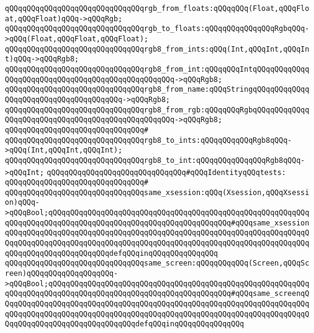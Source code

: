 \verb|qQQqqQQqqQQqqQQqqQQqqQQqqQQqqQQqrgb_from_floats:qQQqqQQq(Float,qQQqFloat,qQQqFloat)qQQq->qQQqRgb;|\newline
\verb|qQQqqQQqqQQqqQQqqQQqqQQqqQQqqQQqrgb_to_floats:qQQqqQQqqQQqqQQqRgbqQQq->qQQq(Float,qQQqFloat,qQQqFloat);|\newline
\newline
\verb|qQQqqQQqqQQqqQQqqQQqqQQqqQQqqQQqrgb8_from_ints:qQQq(Int,qQQqInt,qQQqInt)qQQq->qQQqRgb8;|\newline
\verb|qQQqqQQqqQQqqQQqqQQqqQQqqQQqqQQqrgb8_from_int:qQQqqQQqIntqQQqqQQqqQQqqQQqqQQqqQQqqQQqqQQqqQQqqQQqqQQqqQQqqQQq->qQQqRgb8;|\newline
\verb|qQQqqQQqqQQqqQQqqQQqqQQqqQQqqQQqrgb8_from_name:qQQqStringqQQqqQQqqQQqqQQqqQQqqQQqqQQqqQQqqQQqqQQq->qQQqRgb8;|\newline
\verb|qQQqqQQqqQQqqQQqqQQqqQQqqQQqqQQqrgb8_from_rgb:qQQqqQQqRgbqQQqqQQqqQQqqQQqqQQqqQQqqQQqqQQqqQQqqQQqqQQqqQQqqQQq->qQQqRgb8;|\newline
\verb|qQQqqQQqqQQqqQQqqQQqqQQqqQQqqQQq#|\newline
\verb|qQQqqQQqqQQqqQQqqQQqqQQqqQQqqQQqrgb8_to_ints:qQQqqQQqqQQqRgb8qQQq->qQQq(Int,qQQqInt,qQQqInt);|\newline
\verb|qQQqqQQqqQQqqQQqqQQqqQQqqQQqqQQqrgb8_to_int:qQQqqQQqqQQqqQQqRgb8qQQq->qQQqInt;|\newline
\newline
\verb|qQQqqQQqqQQqqQQqqQQqqQQqqQQqqQQq#qQQqIdentityqQQqtests:|\newline
\verb|qQQqqQQqqQQqqQQqqQQqqQQqqQQqqQQq#|\newline
\verb|qQQqqQQqqQQqqQQqqQQqqQQqqQQqqQQqsame_xsession:qQQq(Xsession,qQQqXsession)qQQq->qQQqBool;qQQqqQQqqQQqqQQqqQQqqQQqqQQqqQQqqQQqqQQqqQQqqQQqqQQqqQQqqQQqqQQqqQQqqQQqqQQqqQQqqQQqqQQqqQQqqQQqqQQqqQQqqQQqqQQq#qQQqsame_xsessionqQQqqQQqqQQqqQQqqQQqqQQqqQQqqQQqqQQqqQQqqQQqqQQqqQQqqQQqqQQqqQQqqQQqqQQqqQQqqQQqqQQqqQQqqQQqqQQqqQQqqQQqqQQqqQQqqQQqqQQqqQQqqQQqqQQqqQQqqQQqqQQqqQQqqQQqqQQqqQQqqQQqdefqQQqinqQQqqQQqqQQqqQQq|\newline
\verb|qQQqqQQqqQQqqQQqqQQqqQQqqQQqqQQqsame_screen:qQQqqQQqqQQq(Screen,qQQqScreen)qQQqqQQqqQQqqQQqqQQq->qQQqBool;qQQqqQQqqQQqqQQqqQQqqQQqqQQqqQQqqQQqqQQqqQQqqQQqqQQqqQQqqQQqqQQqqQQqqQQqqQQqqQQqqQQqqQQqqQQqqQQqqQQqqQQqqQQqqQQq#qQQqsame_screenqQQqqQQqqQQqqQQqqQQqqQQqqQQqqQQqqQQqqQQqqQQqqQQqqQQqqQQqqQQqqQQqqQQqqQQqqQQqqQQqqQQqqQQqqQQqqQQqqQQqqQQqqQQqqQQqqQQqqQQqqQQqqQQqqQQqqQQqqQQqqQQqqQQqqQQqqQQqqQQqqQQqqQQqqQQqdefqQQqinqQQqqQQqqQQqqQQq|\newline
